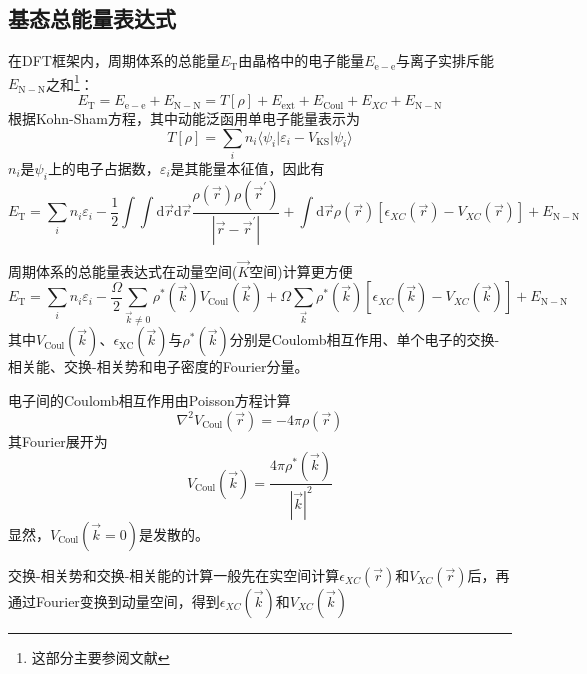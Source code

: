 \subsection{基态总能量表达式}
在DFT框架内，周期体系的总能量$E_{\mathrm{T}}$由晶格中的电子能量$E_{\mathrm{e-e}}$与离子实排斥能$E_{\mathrm{N-N}}$之和\footnote{这部分主要参阅文献}：
	\begin{equation}
		E_{\mathrm{T}}=E_{\mathrm{e-e}}+E_{\mathrm{N-N}}=T[\rho]+E_{\mathrm{ext}}+E_{\mathrm{Coul}}+E_{XC}+E_{\mathrm{N-N}}
	\end{equation}
根据\textrm{Kohn-Sham}方程，其中动能泛函用单电子能量表示为
\begin{equation}
	T[{\rho}]=\sum_in_i\langle\psi_i|\varepsilon_i-V_{\mathrm{KS}}|\psi_i\rangle
\end{equation}
$n_i$是$\psi_i$上的电子占据数，$\varepsilon_i$是其能量本征值，因此有
\begin{equation}
	E_{\mathrm{T}}=\sum_in_i\varepsilon_i-\dfrac12\int\int\mathrm{d}\vec r\mathrm{d}\vec r\dfrac{\rho(\vec r)\rho(\vec r^{\prime})}{|\vec r-\vec r^{\prime}|}+\int\mathrm{d}\vec r\rho(\vec r)[\epsilon_{XC}(\vec r)-V_{XC}(\vec r)]+E_{\mathrm{N-N}}
	\label{eq:PP_TOT_R}
\end{equation}

周期体系的总能量表达式在动量空间($\vec K$空间)计算更方便
\begin{equation}
	E_{\mathrm{T}}=\sum_in_i\varepsilon_i-\dfrac{\Omega}2\sum_{\vec k\neq 0}\rho^{\ast}(\vec k)V_{\mathrm{Coul}}(\vec k)+\Omega\sum_{\vec k}\rho^{\ast}(\vec k)[\epsilon_{XC}(\vec k)-V_{XC}(\vec k)]+E_{\mathrm{N-N}}
\end{equation}
其中$V_{\mathrm{Coul}}(\vec k)$、$\epsilon_{\mathrm{XC}}(\vec k)$与$\rho^{\ast}(\vec k)$分别是\textrm{Coulomb}相互作用、单个电子的交换-相关能、交换-相关势和电子密度的\textrm{Fourier}分量。

电子间的\textrm{Coulomb}相互作用由\textrm{Poisson}方程计算
\begin{equation}
	\nabla^2V_{\mathrm{Coul}}(\vec r)=-4\pi\rho(\vec r)
\end{equation}
其\textrm{Fourier}展开为
\begin{equation}
	V_{\mathrm{Coul}}(\vec k)=\dfrac{4\pi\rho^{\ast}(\vec k)}{|\vec k|^2}
\end{equation}
显然，$V_{\mathrm{Coul}}(\vec k=0)$是发散的。

交换-相关势和交换-相关能的计算一般先在实空间计算$\epsilon_{XC}(\vec r)$和$V_{XC}(\vec r)$后，再通过\textrm{Fourier}变换到动量空间，得到$\epsilon_{XC}(\vec k)$和$V_{XC}(\vec k)$

